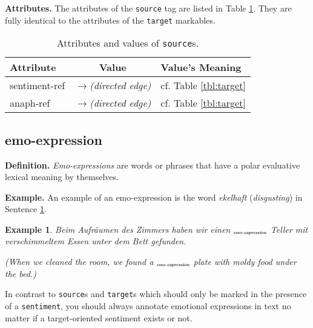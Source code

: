 \documentclass[11pt,a4paper]{article}
\newlength{\clmnwidth}
\theoremstyle{mytheoremstyle}
\newtheorem{exmp}{Example}[section]
\newcommand{\mtag}[2]{{\upshape[\emph{#2}\upshape]$_{\textrm{\bfseries\emph{\tiny
        #1}}}$}}
\newcommand{\emoexpression}[2][]{\mtag{emo-\-ex\-pression\ifstrempty{#1}{}{:#1}}{#2}}
\begin{document}
\noindent\textbf{Attributes.} The attributes of the \texttt{source}
tag are listed in Table \ref{tbl:source}.  They are fully identical to
the attributes of the \texttt{target} markables.
\begin{center}
  \begin{table}[h]
    \caption{Attributes and values of \texttt{source}s.}
    \begin{tabular}{|l|c|p{0.935\clmnwidth}|}\hline
      Attribute & Value & Value's Meaning\\\hline

      sentiment-ref & \textit{$\longrightarrow$\newline(directed
        edge)} & cf. Table \ref{tbl:target}\\\hline

      anaph-ref & \textit{$\longrightarrow$\newline(directed edge)} &
      cf. Table \ref{tbl:target}\\\hline
    \end{tabular}\label{tbl:source}
  \end{table}
\end{center}

\subsection{emo-expression}
\noindent\textbf{Definition.} \emph{Emo-expressions} are words or phrases that
have a polar evaluative lexical meaning by themselves.

\noindent\textbf{Example.} An example of an emo-expression is the word
\textit{ekelhaft} (\textit{disgusting}) in Sentence
\ref{exmp:emo-expr1}.
\begin{exmp}
  Beim Aufr\"aumen des Zimmers haben wir einen
  \emoexpression{ekelhaften} Teller mit verschimmeltem Essen unter dem
  Bett gefunden.

  (When we cleaned the room, we found a \emoexpression{disgusting}
  plate with moldy food under the bed.)\label{exmp:emo-expr1}
\end{exmp}

In contrast to \texttt{source}s and \texttt{target}s which should only
be marked in the presence of a \texttt{sentiment}, you should always
annotate emotional expressions in text no matter if a target-oriented
sentiment exists or not.
\end{document}
